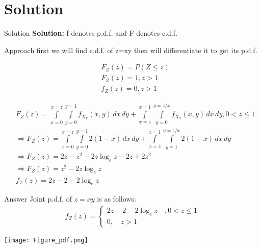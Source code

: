 \documentclass{beamer}
\newcommand{\Int}{\int\limits}
\begin{document}
	\section{Solution}
	\begin{frame}{Solution}
		\textbf{Solution:}
		f denotes p.d.f. and F denotes c.d.f.
		\begin{alertblock}{Approach}
			first we will find c.d.f. of z=xy then will differentiate it to get its p.d.f.
		\end{alertblock}
		\begin{align}
			&F_Z(z)=P(Z \leq z)\\
			&F_Z(z)=1 ,z>1\\
			&f_Z(z)=0 ,z>1
		\end{align}
	\end{frame}
	\begin{frame}
		\begin{align}
			&F_Z(z)=\Int_{x=0}^{x=z} \Int_{y=0}^{y=1}f_X_Y(x,y) \,dx\,dy+\Int_{x=z}^{x=1} \Int_{y=0}^{y=z/x}f_X_Y(x,y) \,dx\,dy,0<z\leq1\\
			&\Rightarrow F_Z(z)=\Int_{x=0}^{x=z} \Int_{y=0}^{y=1}2(1-x) \,dx\,dy+\Int_{x=z}^{x=1} \Int_{y=1}^{y=z/x}2(1-x) \,dx\,dy\\
			&\Rightarrow F_Z(z)=2z-z^{2}-2z\log_ez-2z+2z^{2}\\
			&\Rightarrow F_Z(z)=z^{2}-2z\log_ez\\
			&f_Z(z)=2z-2-2\log_ez
		\end{align}
		
	\end{frame}
	\begin{frame}
		\begin{alertblock}{Answer}
			Joint p.d.f. of $z=xy$ is as follows:
			\begin{align}
				f_Z(z) = \left\{ \begin{array}{ll} 2z-2-2\log_ez \quad ,0<z\leq1\\ 0 ,\quad \text{$z>1$} \end{array} \right. 
			\end{align}  
		\end{alertblock}
		\begin{graphics}
			\centering
			\texttt{[image: Figure\_pdf.png]}
			\label{fig-1}
		\end{graphics}
	\end{frame}
	
\end{document}
